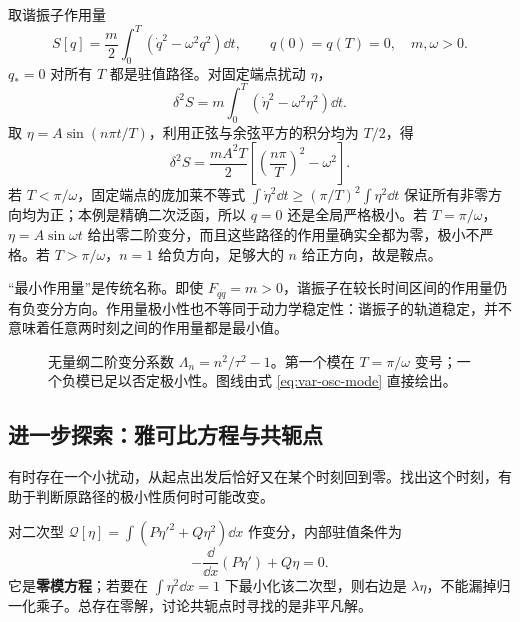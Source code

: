 取谐振子作用量
\[
S[q]=\frac m2\int_0^T(\dot q^2-\omega^2q^2)\dd t,
\qquad q(0)=q(T)=0,\quad m,\omega>0.
\]
$q_*=0$ 对所有 $T$ 都是驻值路径。对固定端点扰动 $\eta$，
\[
\delta^2S=m\int_0^T(\dot\eta^2-\omega^2\eta^2)\dd t.
\]
取 $\eta=A\sin(n\pi t/T)$，利用正弦与余弦平方的积分均为 $T/2$，得
\begin{equation}\label{eq:var-osc-mode}
\delta^2S=\frac{mA^2T}{2}\left[\left(\frac{n\pi}{T}\right)^2-\omega^2\right].
\end{equation}
若 $T<\pi/\omega$，固定端点的庞加莱不等式
$\int\dot\eta^2\dd t\ge(\pi/T)^2\int\eta^2\dd t$
保证所有非零方向均为正；本例是精确二次泛函，所以 $q=0$ 还是全局严格极小。若 $T=\pi/\omega$，$\eta=A\sin\omega t$ 给出零二阶变分，而且这些路径的作用量确实全都为零，极小不严格。若 $T>\pi/\omega$，$n=1$ 给负方向，足够大的 $n$ 给正方向，故是鞍点。
\begin{physicsbox}
“最小作用量”是传统名称。即使 $F_{\dot q\dot q}=m>0$，谐振子在较长时间区间的作用量仍有负变分方向。作用量极小性也不等同于动力学稳定性：谐振子的轨道稳定，并不意味着任意两时刻之间的作用量都是最小值。
\end{physicsbox}
\begin{figure}[htbp]
\centering
{}
\caption{无量纲二阶变分系数 $\Lambda_n=n^2/\tau^2-1$。第一个模在 $T=\pi/\omega$ 变号；一个负模已足以否定极小性。图线由式 \eqref{eq:var-osc-mode} 直接绘出。}
\label{fig:var-second-sign}
\end{figure}

\subsection{进一步探索：雅可比方程与共轭点}
有时存在一个小扰动，从起点出发后恰好又在某个时刻回到零。找出这个时刻，有助于判断原路径的极小性质何时可能改变。

对二次型 $\mathcal Q[\eta]=\int(P\eta'^2+Q\eta^2)\dd x$ 作变分，内部驻值条件为
\begin{equation}\label{eq:jacobi}
-\frac{\dd}{\dd x}(P\eta')+Q\eta=0.
\end{equation}
它是\textbf{零模方程}；若要在 $\int\eta^2\dd x=1$ 下最小化该二次型，则右边是 $\lambda\eta$，不能漏掉归一化乘子。总存在零解，讨论共轭点时寻找的是非平凡解。

